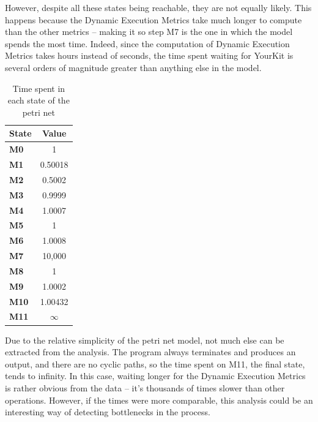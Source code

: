 \documentclass[11pt]{article}
\begin{document}
However, despite all these states being reachable, they are not equally likely.
This happens because the Dynamic Execution Metrics take much longer to compute than the other metrics -- making it so step M7 is the one in which the model spends the most time.
Indeed, since the computation of Dynamic Execution Metrics takes hours instead of seconds, the time spent waiting for YourKit is several orders of magnitude greater than anything else in the model.

\begin{table}[]
\centering
\begin{tabular}{l|c|}
\multicolumn{1}{c|}{\textbf{State}} & \textbf{Value} \\ \hline
\textbf{M0}                         & 1              \\ \hline
\textbf{M1}                         & 0.50018        \\ \hline
\textbf{M2}                         & 0.5002         \\ \hline
\textbf{M3}                         & 0.9999         \\ \hline
\textbf{M4}                         & 1.0007         \\ \hline
\textbf{M5}                         & 1              \\ \hline
\textbf{M6}                         & 1.0008         \\ \hline
\textbf{M7}                         & 10,000         \\ \hline
\textbf{M8}                         & 1              \\ \hline
\textbf{M9}                         & 1.0002         \\ \hline
\textbf{M10}                        & 1.00432        \\ \hline
\textbf{M11}                        & $\infty$       \\ \hline
\end{tabular}
\caption{Time spent in each state of the petri net}
\label{table:times}
\end{table}

Due to the relative simplicity of the petri net model, not much else can be extracted from the analysis.
The program always terminates and produces an output, and there are no cyclic paths, so the time spent on M11, the final state, tends to infinity.
In this case, waiting longer for the Dynamic Execution Metrics is rather obvious from the data -- it's thousands of times slower than other operations.
However, if the times were more comparable, this analysis could be an interesting way of detecting bottlenecks in the process.
\end{document}
